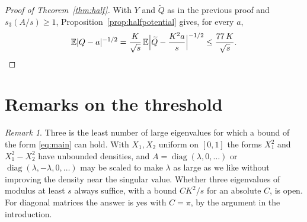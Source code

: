 \documentclass[11pt]{amsart}
\numberwithin{equation}{section}
\theoremstyle{definition}
\theoremstyle{remark}
\newtheorem{remark}[theorem]{Remark}
\newcommand{\E}{\mathbb E}
\newcommand{\1}{\mathbf 1}
\DeclareMathOperator{\diag}{diag}
\newcommand{\abs}[1]{\lvert #1\rvert}
\begin{document}
\begin{proof}[Proof of Theorem~\ref{thm:half}]
With $Y$ and $\widetilde Q$ as in the previous proof and $s_3(A/s)\ge1$, Proposition~\ref{prop:halfpotential} gives, for every $a$,
\[
\E\abs{Q-a}^{-1/2}=\frac K{\sqrt s}\,\E\Bigl\lvert\widetilde Q-\frac{K^2a}s\Bigr\rvert^{-1/2}\le\frac{77\,K}{\sqrt s}.\qedhere
\]
\end{proof}

\section{Remarks on the threshold}\label{sec:remarks}

\begin{remark}\label{rem:three}
Three is the least number of large eigenvalues for which a bound of the form \eqref{eq:main} can hold. With $X_1,X_2$ uniform on $[0,1]$ the forms $X_1^2$ and $X_1^2-X_2^2$ have unbounded densities, and $A=\diag(\lambda,0,\dots)$ or $\diag(\lambda,-\lambda,0,\dots)$ may be scaled to make $\lambda$ as large as we like without improving the density near the singular value. Whether three eigenvalues of modulus at least $s$ always suffice, with a bound $CK^2/s$ for an absolute $C$, is open. For diagonal matrices the answer is yes with $C=\pi$, by the argument in the introduction.
\end{remark}
\end{document}
